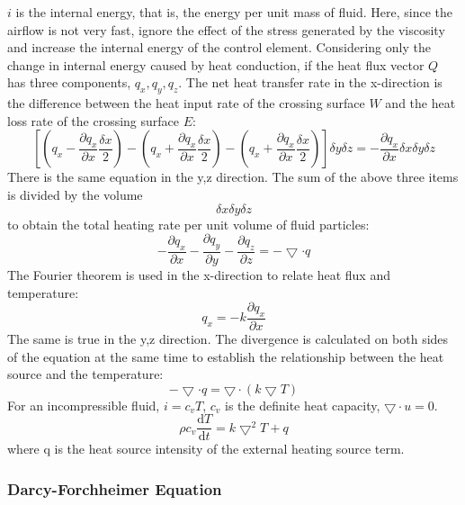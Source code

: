 \documentclass{apmcmthesis}
\begin{document}
$i$ is the internal energy, that is, the energy per unit mass of fluid. Here, since the airflow is not very fast, ignore the effect of the stress generated by the viscosity and increase the internal energy of the control element. Considering only the change in internal energy caused by heat conduction, if the heat flux vector $Q$ has three components, $q_x, q_y, q_z$. The net heat transfer rate in the x-direction is the difference between the heat input rate of the crossing surface $W$ and the heat loss rate of the crossing surface $E$:
$$[(q_x-\frac{\partial q_x}{\partial x}\frac{\delta x}{2})-(q_x+\frac{\partial q_x}{\partial x}\frac{\delta x}{2})-(q_x+\frac{\partial q_x}{\partial x}\frac{\delta x}{2})]\delta y\delta z=-\frac{\partial q_x}{\partial x}\delta x\delta y\delta z$$
There is the same equation in the y,z direction. The sum of the above three items is divided by the volume $$\delta x \delta y\delta z$$ to obtain the total heating rate per unit volume of fluid particles:
$$-\frac{\partial q_x}{\partial x} -\frac{\partial q_y}{\partial y}-\frac{\partial q_z}{\partial z}=-\bigtriangledown \cdot q$$
The Fourier theorem is used in the x-direction to relate heat flux and temperature:
$$q_x=-k \frac{\partial q_x}{\partial x}$$
The same is true in the y,z direction. The divergence is calculated on both sides of the equation at the same time to establish the relationship between the heat source and the temperature:
$$-\bigtriangledown  \cdot q=\bigtriangledown \cdot (k\bigtriangledown T)$$
For an incompressible fluid, $i=c_v T$, $c_v$ is the definite heat capacity, $\bigtriangledown \cdot u=0$.
$$\rho c_v\frac{\mathrm{d} T}{\mathrm{d} t} =k\bigtriangledown^2T+q$$
where q is the heat source intensity of the external heating source term.

\subsubsection{Darcy-Forchheimer Equation}
\end{document}
